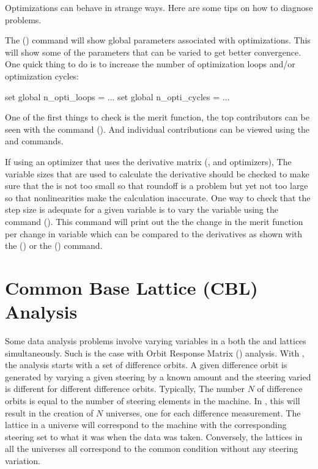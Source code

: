 {{{{{{{{Optimizations can behave in strange ways. Here are some tips on how to diagnose problems.

The  () command will show global parameters
associated with optimizations. This will show some of the parameters that can be 
varied to get better convergence. One quick thing to do is to increase the number of
optimization loops and/or optimization cycles:
\begin{example}
	set global n_opti_loops = ...
	set global n_opti_cycles = ...
\end{example}

One of the first things to check is the merit function, the top contributors can be seen
with the command  (). And individual contributions
can be viewed using the  and  commands.

If using an optimizer that uses the derivative matrix (,  and 
 optimizers), The variable  sizes that are used to calculate the derivative
should be checked to make sure that the  is not too small so that roundoff is a problem
but yet not too large so that nonlinearities make the calculation inaccurate. One way to
check that the step size is adequate for a given variable is to vary the variable using
the command  (). This command will print out the the change
in the merit function per change in variable which can be compared to the derivatives 
as shown with the  () or the
 () command.

\section{Common Base Lattice (CBL) Analysis}
\label{s:cbl}

Some data analysis problems involve varying variables in a both the
 and  lattices simultaneously. Such is the case
with Orbit Response Matrix () analysis\cite{b:orm}. With
, the analysis starts with a set of difference orbits. A given
difference orbit is generated by varying a given steering by a known
amount and the steering varied is different for different difference
orbits. Typically, The number $N$ of difference orbits is equal to the
number of steering elements in the machine. In \tao, this will result
in the creation of $N$ universes, one for each difference
measurement. The  lattice in a universe will correspond to
the machine with the corresponding steering set to what it was when
the data was taken. Conversely, the  lattices in all the
universes all correspond to the common condition without any steering
variation.

}}}}}}}}
